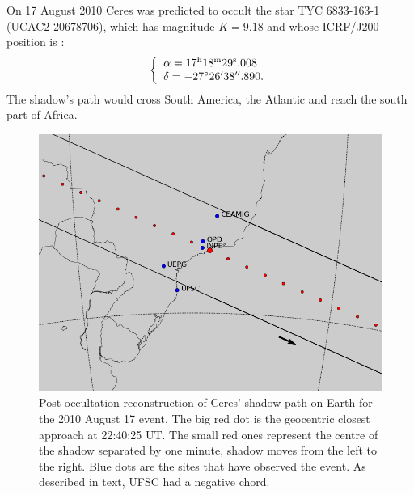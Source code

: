 \documentclass[useAMS,usenatbib]{mn2e}
\begin{document}
%
On 17 August 2010 Ceres was predicted to occult the star TYC 6833-163-1 (UCAC2 20678706), which has magnitude $K=9.18$ and whose ICRF/J200 position is \citep{Zacharias2004}:
%
\begin{equation}
\left\{ 
  \begin{array}{l l}
    \alpha = 17^{\text{h}}18^{\text{m}}29^{\text{s}}.008\\
    \delta = -27\hbox{$^\circ$} 26\hbox{$^\prime$} 38\hbox{$^{\prime\prime}$}.890.
  \end{array}
\right.
\end{equation}
%
The shadow's path would cross South America, the Atlantic and reach the south part of Africa.

\begin{figure}
\includegraphics[scale=0.42]{figures/Ceres_2010.png} 
\caption{Post-occultation reconstruction of Ceres' shadow path on Earth for the 2010 August 17 event. The big red dot is the geocentric closest approach at 22:40:25 UT. The small red ones represent the centre of the shadow separated by one minute, shadow moves from the left to the right. Blue dots are the sites that have observed the event. As described in text, UFSC had a negative chord.
\label{Fig: Ceres-2010-map}}
\end{figure}
\end{document}

